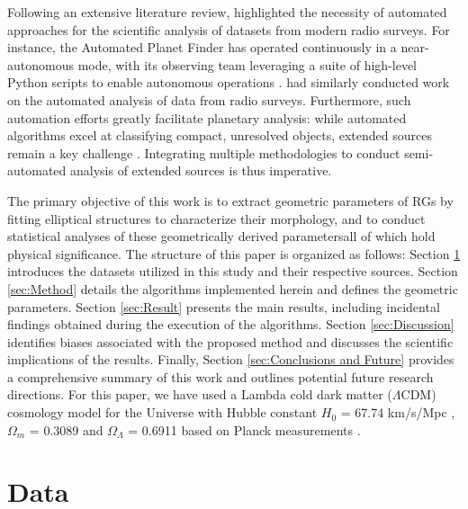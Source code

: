 \documentclass{aa}
\begin{document}
Following an extensive literature review, \cite{mingo_revisiting_2019} highlighted the necessity of automated approaches for the scientific analysis of datasets from modern radio surveys. For instance, the Automated Planet Finder has operated continuously in a near-autonomous mode, with its observing team leveraging a suite of high-level Python scripts to enable autonomous operations \citep{radovan_automated_2014,vogt_apflick_2014}. \cite{gupta_machine_2025} had similarly conducted work on the automated analysis of data from radio surveys. Furthermore, such automation efforts greatly facilitate planetary analysis: while automated algorithms excel at classifying compact, unresolved objects, extended sources remain a key challenge \citep{boyce_hydra_2023,boyce_hydra_2023-1}. Integrating multiple methodologies to conduct semi-automated analysis of extended sources is thus imperative.

The primary objective of this work is to extract geometric parameters of RGs by fitting elliptical structures to characterize their morphology, and to conduct statistical analyses of these geometrically derived parameters\textemdash all of which hold physical significance. The structure of this paper is organized as follows: Section \ref{sec:Data} introduces the datasets utilized in this study and their respective sources. Section \ref{sec:Method} details the algorithms implemented herein and defines the geometric parameters. Section \ref{sec:Result} presents the main results, including incidental findings obtained during the execution of the algorithms. Section \ref{sec:Discussion} identifies biases associated with the proposed method and discusses the scientific implications of the results. Finally, Section \ref{sec:Conclusions and Future} provides a comprehensive summary of this work and outlines potential future research directions.
For this paper, we have used a Lambda cold dark matter ($ \Lambda\text{CDM} $) cosmology model for the Universe with Hubble constant $H_{0}$ = 67.74 km/s/Mpc , $\Omega_m$ = 0.3089 and $\Omega_\Lambda$ = 0.6911 based on Planck measurements \citep{collaboration_planck_2016}.




\section{Data}\label{sec:Data}
\end{document}
